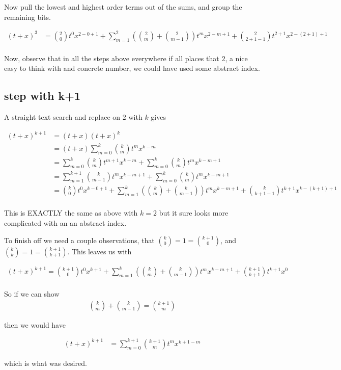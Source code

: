 \documentclass{article}
\begin{document}
Now pull the lowest and highest order terms out of the sums, and group the
remaining bits.

\begin{align*}
(t + x)^3 
&= 
 \binom{2}{0} t^{0} x^{2 - 0 + 1} 
+ \sum_{m=1}^{2} \left( \binom{2}{m} + \binom{2}{m-1} \right) t^{m} x^{2 - m + 1} 
+ \binom{2}{2 + 1 -1} t^{2 + 1} x^{2 - (2 + 1) + 1} 
\\
\end{align*}

Now, observe that in all the steps above everywhere if all places that $2$, a nice easy to think with and concrete number, we could have used some
abstract index.

\subsection{ step with k+1 }

A straight text search and replace on $2$ with $k$ gives

\begin{align*}
(t + x)^{k+1}
&= (t + x)(t + x)^k  \\
&= (t + x)\sum_{m=0}^k \binom{k}{m} t^m x^{k-m} \\
&= 
\sum_{m=0}^k \binom{k}{m} t^{m+1} x^{k-m} 
+ \sum_{m=0}^k \binom{k}{m} t^{m} x^{k-m + 1} \\
&= 
\sum_{m=1}^{k + 1} \binom{k}{m-1} t^{m} x^{k - m + 1} 
+ \sum_{m=0}^k \binom{k}{m} t^{m} x^{k-m + 1} \\
&= 
 \binom{k}{0} t^{0} x^{k - 0 + 1} 
+ \sum_{m=1}^{k} \left( \binom{k}{m} + \binom{k}{m-1} \right) t^{m} x^{k - m + 1} 
+ \binom{k}{k + 1 -1} t^{k + 1} x^{k - (k + 1) + 1} \\
\end{align*}

This is EXACTLY the same as above with $k=2$ but it sure looks more complicated with an an abstract index.

To finish off we need a couple observations, that 
$\binom{k}{0} = 1 = \binom{k+1}{0}$, and $\binom{k}{k} = 1 = \binom{k+1}{k+1}$.  This leaves us with

\begin{align*}
(t + x)^{k+1}
= \binom{k+1}{0} t^{0} x^{k + 1} 
+ \sum_{m=1}^{k} \left( \binom{k}{m} + \binom{k}{m-1} \right) t^{m} x^{k - m + 1} 
+ \binom{k + 1}{k + 1} t^{k + 1} x^{0} \\
\end{align*}

So if we can show
\begin{align*}
\binom{k}{m} + \binom{k}{m-1} = \binom{k+1}{m}
\end{align*}

then we would have

\begin{align*}
(t + x)^{k+1}
&= \sum_{m=0}^{k+1} \binom{k+1}{m} t^{m} x^{k + 1 - m} 
\end{align*}

which is what was desired.

%
%
\end{document}
